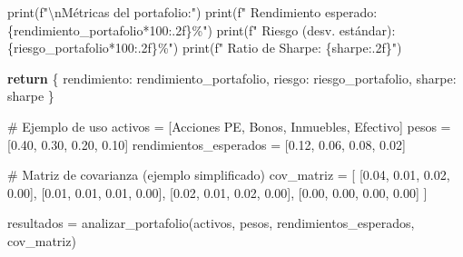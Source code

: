 \documentclass[
  doc,
  floatsintext,
  longtable,
  a4paper,
  nolmodern,
  notxfonts,
  notimes,
  12pt,
  colorlinks=true,linkcolor=blue,citecolor=blue,urlcolor=blue]{apa7}
\newenvironment{Shaded}{\begin{snugshade}}{\end{snugshade}}
\newcommand{\BuiltInTok}[1]{\textcolor[rgb]{0.00,0.23,0.31}{#1}}
\newcommand{\CharTok}[1]{\textcolor[rgb]{0.13,0.47,0.30}{#1}}
\newcommand{\CommentTok}[1]{\textcolor[rgb]{0.37,0.37,0.37}{#1}}
\newcommand{\ControlFlowTok}[1]{\textcolor[rgb]{0.00,0.23,0.31}{\textbf{#1}}}
\newcommand{\DecValTok}[1]{\textcolor[rgb]{0.68,0.00,0.00}{#1}}
\newcommand{\FloatTok}[1]{\textcolor[rgb]{0.68,0.00,0.00}{#1}}
\newcommand{\NormalTok}[1]{\textcolor[rgb]{0.00,0.23,0.31}{#1}}
\newcommand{\OperatorTok}[1]{\textcolor[rgb]{0.37,0.37,0.37}{#1}}
\newcommand{\SpecialCharTok}[1]{\textcolor[rgb]{0.37,0.37,0.37}{#1}}
\newcommand{\SpecialStringTok}[1]{\textcolor[rgb]{0.13,0.47,0.30}{#1}}
\newcommand{\StringTok}[1]{\textcolor[rgb]{0.13,0.47,0.30}{#1}}
\begin{document}
\begin{Shaded}
\begin{Highlighting}[]
    \BuiltInTok{print}\NormalTok{(}\SpecialStringTok{f"}\CharTok{\textbackslash{}n}\SpecialStringTok{Métricas del portafolio:"}\NormalTok{)}
    \BuiltInTok{print}\NormalTok{(}\SpecialStringTok{f"  Rendimiento esperado: }\SpecialCharTok{\{}\NormalTok{rendimiento\_portafolio}\OperatorTok{*}\DecValTok{100}\SpecialCharTok{:.2f\}}\SpecialStringTok{\%"}\NormalTok{)}
    \BuiltInTok{print}\NormalTok{(}\SpecialStringTok{f"  Riesgo (desv. estándar): }\SpecialCharTok{\{}\NormalTok{riesgo\_portafolio}\OperatorTok{*}\DecValTok{100}\SpecialCharTok{:.2f\}}\SpecialStringTok{\%"}\NormalTok{)}
    \BuiltInTok{print}\NormalTok{(}\SpecialStringTok{f"  Ratio de Sharpe: }\SpecialCharTok{\{}\NormalTok{sharpe}\SpecialCharTok{:.2f\}}\SpecialStringTok{"}\NormalTok{)}
    
    \ControlFlowTok{return}\NormalTok{ \{}
        \StringTok{\textquotesingle{}rendimiento\textquotesingle{}}\NormalTok{: rendimiento\_portafolio,}
        \StringTok{\textquotesingle{}riesgo\textquotesingle{}}\NormalTok{: riesgo\_portafolio,}
        \StringTok{\textquotesingle{}sharpe\textquotesingle{}}\NormalTok{: sharpe}
\NormalTok{    \}}

\CommentTok{\# Ejemplo de uso}
\NormalTok{activos }\OperatorTok{=}\NormalTok{ [}\StringTok{\textquotesingle{}Acciones PE\textquotesingle{}}\NormalTok{, }\StringTok{\textquotesingle{}Bonos\textquotesingle{}}\NormalTok{, }\StringTok{\textquotesingle{}Inmuebles\textquotesingle{}}\NormalTok{, }\StringTok{\textquotesingle{}Efectivo\textquotesingle{}}\NormalTok{]}
\NormalTok{pesos }\OperatorTok{=}\NormalTok{ [}\FloatTok{0.40}\NormalTok{, }\FloatTok{0.30}\NormalTok{, }\FloatTok{0.20}\NormalTok{, }\FloatTok{0.10}\NormalTok{]}
\NormalTok{rendimientos\_esperados }\OperatorTok{=}\NormalTok{ [}\FloatTok{0.12}\NormalTok{, }\FloatTok{0.06}\NormalTok{, }\FloatTok{0.08}\NormalTok{, }\FloatTok{0.02}\NormalTok{]}

\CommentTok{\# Matriz de covarianza (ejemplo simplificado)}
\NormalTok{cov\_matriz }\OperatorTok{=}\NormalTok{ [}
\NormalTok{    [}\FloatTok{0.04}\NormalTok{, }\FloatTok{0.01}\NormalTok{, }\FloatTok{0.02}\NormalTok{, }\FloatTok{0.00}\NormalTok{],}
\NormalTok{    [}\FloatTok{0.01}\NormalTok{, }\FloatTok{0.01}\NormalTok{, }\FloatTok{0.01}\NormalTok{, }\FloatTok{0.00}\NormalTok{],}
\NormalTok{    [}\FloatTok{0.02}\NormalTok{, }\FloatTok{0.01}\NormalTok{, }\FloatTok{0.02}\NormalTok{, }\FloatTok{0.00}\NormalTok{],}
\NormalTok{    [}\FloatTok{0.00}\NormalTok{, }\FloatTok{0.00}\NormalTok{, }\FloatTok{0.00}\NormalTok{, }\FloatTok{0.00}\NormalTok{]}
\NormalTok{]}

\NormalTok{resultados }\OperatorTok{=}\NormalTok{ analizar\_portafolio(activos, pesos, rendimientos\_esperados, cov\_matriz)}
\end{Highlighting}
\end{Shaded}
\end{document}
